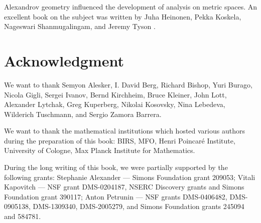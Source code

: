 Alexandrov geometry influenced the development of analysis on metric spaces. 
An excellent book on the subject was written by Juha Heinonen, Pekka Koskela, Nageswari Shanmugalingam, and Jeremy Tyson \cite{heinonen-koskela-shanmugalingam-tyson}.

\section*{Acknowledgment}
We want to thank 
Semyon Alesker,
I. David Berg,
Richard Bishop, 
Yuri Burago, 
Nicola Gigli,
Sergei Ivanov,
Bernd Kirchheim, 
Bruce Kleiner, 
John Lott,
Alexander Lytchak, 
Greg Kuperberg, 
Nikolai Kosovsky, 
Nina Lebedeva,
Wilderich Tuschmann, and
Sergio Zamora Barrera.


We want to thank the mathematical institutions which hosted various authors during the preparation of this book: %
BIRS, 
MFO, 
Henri Poincar\'{e} Institute,
University of Cologne, 
Max Planck Institute for Mathematics.


During the long writing of this book, we were partially supported by the following grants:
Stephanie Alexander --- 
Simons Foundation grant 209053;
Vitali Kapovitch ---  NSF grant DMS-0204187, NSERC Discovery grants and Simons Foundation grant 390117;
Anton Petrunin --- 
NSF grants
DMS-0406482,
DMS-0905138,
DMS-1309340,
DMS-2005279,
and Simons Foundation grants 
245094 and 584781.

